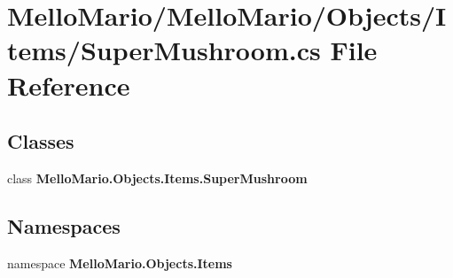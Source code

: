 \section{Mello\+Mario/\+Mello\+Mario/\+Objects/\+Items/\+Super\+Mushroom.cs File Reference}
\label{SuperMushroom_8cs}
\subsection*{Classes}
\begin{DoxyCompactItemize}
\item 
class \textbf{ Mello\+Mario.\+Objects.\+Items.\+Super\+Mushroom}
\end{DoxyCompactItemize}
\subsection*{Namespaces}
\begin{DoxyCompactItemize}
\item 
namespace \textbf{ Mello\+Mario.\+Objects.\+Items}
\end{DoxyCompactItemize}
